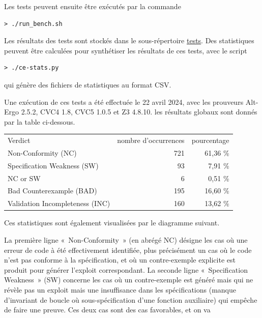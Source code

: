 \documentclass[a4paper,11pt]{article}
\begin{document}
Les tests peuvent ensuite être exécutés par la commande
\begin{lstlisting}
> ./run_bench.sh
\end{lstlisting}
Les résultats des tests sont stockés dans le sous-répertoire
\url{tests}. Des statistiques peuvent être calculées pour synthétiser
les résultats de ces tests, avec le script
\begin{lstlisting}
> ./ce-stats.py
\end{lstlisting}
qui génère des fichiers de statistiques au format CSV.

Une exécution de ces tests a été effectuée
le 22 avril 2024, avec les prouveurs Alt-Ergo 2.5.2, CVC4 1.8, CVC5
1.0.5 et Z3 4.8.10. les résultats globaux sont donnés par la table ci-dessous.
  \begin{center}
  \begin{tabular}{|l|r|r|}
    \hline
  \rowcolor{gray!50} Verdict
  & \multicolumn{1}{p{0.13\textwidth}|}{nombre d'occurrences}
  & \multicolumn{1}{p{0.13\textwidth}|}{pourcentage}
  \\
Non-Conformity (NC)         & 721 & 61,36 \% \\
Specification Weakness (SW) & 93 & 7,91 \% \\
NC or SW  	       & 6 & 0,51 \% \\
Bad Counterexample (BAD) & 195 & 16,60 \% \\
    Validation Incompleteness (INC) & 160 & 13,62 \% \\
    \hline
  \end{tabular}
\end{center}
Ces statistiques sont également visualisées par le diagramme
  suivant.
  \begin{center}
\end{center}
La première ligne «~Non-Conformity~» (en abrégé NC) désigne les cas où une
erreur de code à été effectivement identifiée, plus précisément un cas où le
code n'est pas conforme à la spécification, et où un contre-exemple explicite
est produit pour générer l'exploit correspondant. La seconde ligne
«~Specification Weakness~» (SW) concerne les cas où un contre-exemple est généré
mais qui ne révèle pas un exploit mais une insuffisance dans les spécifications
(manque d'invariant de boucle où sous-spécification d'une fonction auxiliaire)
qui empêche de faire une preuve. Ces deux cas sont des cas favorables, et on va
\end{document}
